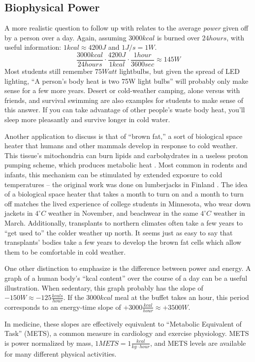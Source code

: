 \documentclass[12pt]{iopart}
\newcommand{\be}{\begin{equation}}
\newcommand{\ee}{\end{equation}}
\newcommand{\degC}{^{\circ}C}
\begin{document}
\subsection{Biophysical Power}
A more realistic question to follow up with relates to the average \textit{power} given off by a person over a day.  
Again, assuming $3000kcal$ is burned over $24 hours$, with useful information: $1 kcal \approx 4200J$ and $1 J/s=1W$.
\be
\frac{3000kcal}{24hours}\cdot\frac{4200J}{1kcal}\cdot\frac{1hour}{3600sec}\approx145W
\ee
Most students still remember $75Watt$ lightbulbs, but given the spread of LED lighting, ``A person's body heat is two 75W light bulbs'' will probably only make sense for a few more years.  Desert or cold-weather camping, alone versus with friends, and survival swimming are also examples for students to make sense of this answer.  If you can take advantage of other people's waste body heat, you'll sleep more pleasantly and survive longer in cold water.  

Another application to discuss is that of ``brown fat,'' a sort of biological space heater that humans and other mammals develop in response to cold weather.  This tissue's mitochondria can burn lipids and carbohydrates in a useless proton pumping scheme, which produces metabolic heat \cite{brown_fat_1,brown_fat_2,brown_fat_3,brown_fat_4}.  Most common in rodents and infants, this mechanism can be stimulated by extended exposure to cold temperatures -- the original work was done on lumberjacks in Finland \cite{finland_lumberjacks} .  The idea of a biological space heater that takes a month to turn on and a month to turn off matches the lived experience of college students in Minnesota, who wear down jackets in $4\degC$ weather in November, and beachwear in the same $4\degC$ weather in March.  Additionally, transplants to northern climates often take a few years to ``get used to'' the colder weather up north. It seems just as easy to say that transplants' bodies take a few years to develop the brown fat cells which allow them to be comfortable in cold weather.

One other distinction to emphasize is the difference between power and energy.  A graph of a human body's ``kcal content'' over the course of a day can be a useful illustration.  When sedentary, this graph probably has the slope of $-150W\approx -125 \frac{kcals}{hour}$.  If the $3000kcal$ meal at the buffet takes an hour, this period corresponds to an energy-time slope of $+3000\frac{kcal}{hour}\approx +3500W$.  

In medicine, these slopes are effectively equivalent to ``Metabolic Equivalent of Task'' (METS), a common measure in cardiology and exercise physiology.  METS is power normalized by mass, $1METS=1\frac{kcal}{kg\cdot hour}$, and METS levels are available for many different physical activities. \cite{METS}
\end{document}
